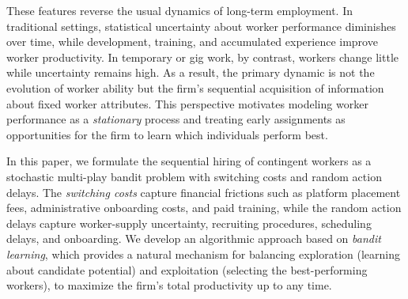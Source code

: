 \documentclass[opre,blindrev]{informs3}
\begin{document}
These features reverse the usual dynamics of long-term employment. In traditional settings, statistical uncertainty about worker performance diminishes over time, while development, training, and accumulated experience improve worker productivity. In temporary or gig work, by contrast, workers change little while uncertainty remains high. As a result, the primary dynamic is not the evolution of worker ability but the firm's sequential acquisition of information about fixed worker attributes. This perspective motivates modeling worker performance as a \emph{stationary} process and treating early assignments as opportunities for the firm to learn which individuals perform best.


In this paper, we formulate the sequential hiring of contingent workers as a stochastic multi-play bandit problem with switching costs and random action delays. 
The \emph{switching costs} capture financial frictions such as platform placement fees, administrative onboarding costs, and paid training, while the random action delays capture worker-supply uncertainty, recruiting procedures, scheduling delays, and onboarding.
We develop an algorithmic approach based on \emph{bandit learning}, which provides a natural mechanism for balancing exploration (learning about candidate potential) and exploitation (selecting the best-performing workers), to maximize the firm's total productivity up to any time.
\end{document}
